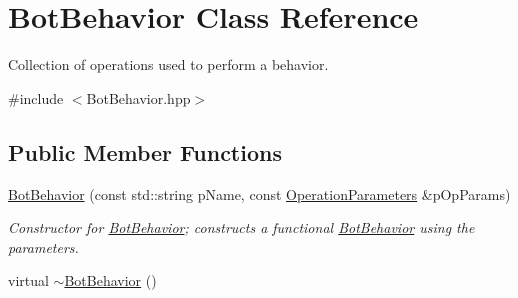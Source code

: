 \hypertarget{classBotBehavior}{\section{Bot\-Behavior Class Reference}
\label{classBotBehavior}
}


Collection of operations used to perform a behavior.  




{\ttfamily \#include $<$Bot\-Behavior.\-hpp$>$}

\subsection*{Public Member Functions}
\begin{DoxyCompactItemize}
\item 
\hyperlink{classBotBehavior_a07b5a5aa8e4318002515477f1d1405c5}{Bot\-Behavior} (const std\-::string p\-Name, const \hyperlink{classOperationParameters}{Operation\-Parameters} \&p\-Op\-Params)
\begin{DoxyCompactList}\small\item\em Constructor for \hyperlink{classBotBehavior}{Bot\-Behavior}; constructs a functional \hyperlink{classBotBehavior}{Bot\-Behavior} using the parameters. \end{DoxyCompactList}\item 
\hypertarget{classBotBehavior_aeb1982788a2b9f91a024103fcc07baf1}{virtual \hyperlink{classBotBehavior_aeb1982788a2b9f91a024103fcc07baf1}{$\sim$\-Bot\-Behavior} ()}\label{classBotBehavior_aeb1982788a2b9f91a024103fcc07baf1}


\end{DoxyCompactItemize}
